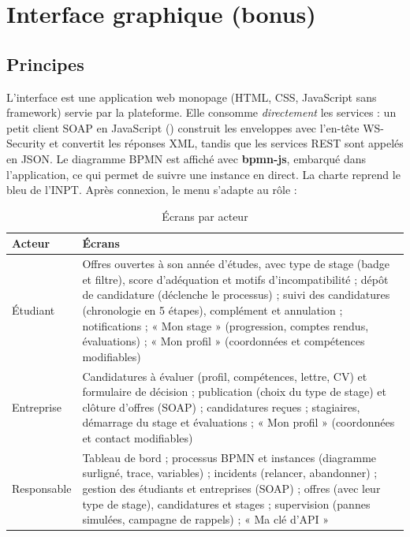\chapter{Interface graphique (bonus)}\label{chap:interface}

\section{Principes}
L'interface est une application web monopage (HTML, CSS, JavaScript sans framework) servie par la plateforme. Elle
consomme \emph{directement} les services : un petit client SOAP en JavaScript () construit les enveloppes
avec l'en-tête WS-Security et convertit les réponses XML, tandis que les services REST sont appelés en JSON. Le
diagramme BPMN est affiché avec \textbf{bpmn-js}, embarqué dans l'application, ce qui permet de suivre une instance
en direct. La charte reprend le bleu de l'INPT. Après connexion, le menu s'adapte au rôle :

\begin{table}[htbp]
\centering\small
\caption{Écrans par acteur}
\begin{tabularx}{\textwidth}{@{}lY@{}}
\toprule
\textbf{Acteur} & \textbf{Écrans} \\
\midrule
Étudiant & Offres ouvertes à son année d'études, avec type de stage (badge et filtre), score d'adéquation et motifs d'incompatibilité ; dépôt de candidature (déclenche le
  processus) ; suivi des candidatures (chronologie en 5 étapes), complément et annulation ; notifications ; « Mon stage » (progression,
  comptes rendus, évaluations) ; « Mon profil » (coordonnées et compétences modifiables) \\
Entreprise & Candidatures à évaluer (profil, compétences, lettre, CV) et formulaire de décision ; publication (choix
  du type de stage) et clôture d'offres (SOAP) ; candidatures reçues ; stagiaires, démarrage du stage et évaluations ; « Mon profil » (coordonnées et contact modifiables) \\
Responsable & Tableau de bord ; processus BPMN et instances (diagramme surligné, trace, variables) ; incidents
  (relancer, abandonner) ; gestion des étudiants et entreprises (SOAP) ; offres (avec leur type de stage), candidatures et stages ; supervision
  (pannes simulées, campagne de rappels) ; « Ma clé d'API » \\
\bottomrule
\end{tabularx}
\end{table}

